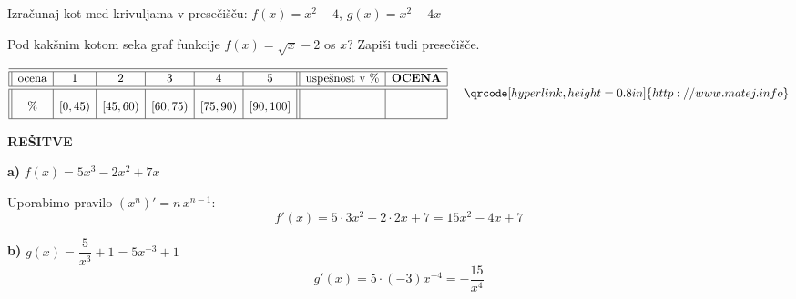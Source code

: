 \documentclass[a4paper,12pt]{letter}
\newcounter{tocke}
\begin{document}
\newpage
\def\tocke4{6}
\begin{naloga}[\hfill \quad $\tocke4$
\qquad \rightsquigarrow \vert a.\qquad|b.\qquad|c.\qquad|]
\addtocounter{tocke}{\tocke4}
{Izračunaj kot med krivuljama v presečišču:}
$f(x)=x^2-4$, \quad $g(x)=x^2-4x$
\end{naloga}

\newpage
\def\tocke5{6}
\begin{naloga}[\hfill \quad $\tocke5$
\qquad \rightsquigarrow \vert a.\qquad|b.\qquad|c.\qquad|]
\addtocounter{tocke}{\tocke5}
Pod kakšnim kotom seka graf funkcije $f(x)=\sqrt{x}-2$ os $x?$ Zapiši tudi presečišče.
\end{naloga}

\vfill
{}
\begin{kriterij*}
$$
\begin{array}{||c|c|c|c|c|c||>{}c|c|}
\hline\hline
\textup{ocena}& 1&2&3&4&5&\textrm{uspe\v{s}nost v } \%& \textrm{\bf OCENA}\\
\hline\hline
\% & [0,45) &[45,60)&[60,75) &[75,90) & [90,100]&
\mbox{\phantom{\huge{$\frac{5}{445}$15}}} & \\
\hline
\end{array}
\hspace*{0.5cm}\vspace*{-0.3cm}
\qrcode[hyperlink,height=0.8in]{http://www.matej.info}
$$
\vspace*{0.1cm}
\end{kriterij*}


\newpage
\begin{center}
{\Large\bfseries\color{brown} REŠITVE}
\end{center}

\begin{resitev}

\textbf{a)} $f(x)=5x^3-2x^2+7x$

Uporabimo pravilo $(x^n)'=n\,x^{n-1}$:
$$
f'(x)=5\cdot3x^2 - 2\cdot2x + 7 = \boxed{15x^2-4x+7}
$$

\textbf{b)} $g(x)=\dfrac{5}{x^3}+1 = 5x^{-3}+1$
$$
g'(x)=5\cdot(-3)x^{-4} = \boxed{-\dfrac{15}{x^4}}
$$

\end{resitev}

\vspace{0.5cm}
\end{document}

